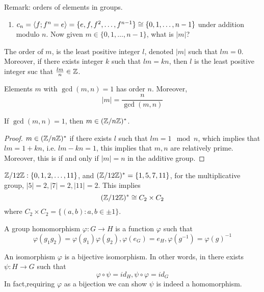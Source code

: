 Remark: orders of elements in groups.
\begin{enumerate}
    \item $c_n=\langle f; f^n=e\rangle=\{e, f, f^2, \dots, f^{n-1}\}\cong \{0,1,\dots, n-1\}$ under addition modulo $n$. Now given $m\in\{0,1,\dots,n-1\}$, what is $|m|$?
\end{enumerate}
\begin{defn}[order]
    The order of $m$, is the least positive integer $l$, denoted $|m|$ such that $lm=0$. Moreover, if there exists integer $k$ such that $lm=kn$, then $l$ is the least positive integer suc that $\frac{lm}{n}\in\mathbb{Z}$.
\end{defn}
\begin{prop}
    Elements $m$ with $\gcd(m,n)=1$ has order $n$.
    Moreover, 
    \begin{equation*}
        |m|=\frac{n}{\gcd(m,n)}
    \end{equation*}
\end{prop}
\begin{prop}
    If $\gcd(m,n)=1$, then $m\in(\mathbb{Z}/n\mathbb{Z})^*$.
\end{prop}
\begin{proof}
    $m\in(\mathbb{Z}/n\mathbb{Z})^*$ if there exists $l$ such that $lm=1\mod n$, which implies that $lm=1+kn$, i.e. $lm-kn=1$, this implies that $m,n$ are relatively prime. Moreover, this is if and only if $|m|=n$ in the additive group.
\end{proof}
\begin{example}
    $\mathbb{Z}/12\mathbb{Z}: \{0,1,2,\dots, 11\}$, and $(\mathbb{Z}/12\mathbb{Z})^*=\{1,5,7,11\}$, for the multiplicative group, $|5|=2, |7|=2, |11|=2$. This implies 
    \begin{equation*}
        (\mathbb{Z}/12\mathbb{Z})^*\cong C_2\times C_2
    \end{equation*}
    where $C_2\times C_2=\{(a,b):a, b\in \pm 1\}$.
\end{example}
\begin{defn}
    A group homomorphism $\varphi:G\to H$ is a function $\varphi$ such that 
    \begin{equation*}
        \varphi(g_1g_2)=\varphi(g_1)\varphi(g_2), \varphi(e_G)=e_H, \varphi(g^{-1})=\varphi(g)^{-1}
    \end{equation*}
\end{defn}
\begin{defn}[isomorphism]
    An isomorphism $\varphi$ is a bijective isomorphism. In other words, in there exists $\psi: H\to G$ such that 
    \begin{equation*}
        \varphi\circ\psi=id_H, \psi\circ\varphi=id_G
    \end{equation*}
    In fact,requiring $\varphi$ as a bijection we can show $\psi$ is indeed a homomorphism.
\end{defn}
